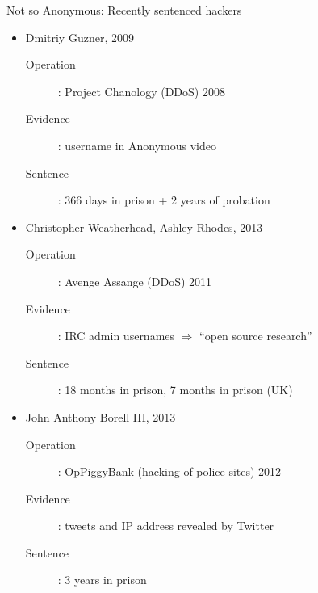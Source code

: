 \documentclass{beamer}
\begin{document}
\begin{frame}{Not so Anonymous: Recently sentenced hackers}
\begin{itemize}
\item Dmitriy Guzner, 2009
\begin{description}
\item[Operation]: Project Chanology (DDoS) 2008
\item[Evidence]: username in Anonymous video
\item[Sentence]: 366 days in prison + 2 years of probation
\end{description}
\item Christopher Weatherhead, Ashley Rhodes, 2013
\begin{description}
\item[Operation]: Avenge Assange (DDoS) 2011
\item[Evidence]: IRC admin usernames $\Rightarrow$ ``open source research''
\item[Sentence]: 18 months in prison, 7 months in prison (UK)
\end{description}
\item John Anthony Borell III, 2013
\begin{description}
\item[Operation]: OpPiggyBank (hacking of police sites) 2012
\item[Evidence]: tweets and IP address revealed by Twitter
\item[Sentence]: 3 years in prison
\end{description}
\end{itemize}
\end{frame}
\end{document}
